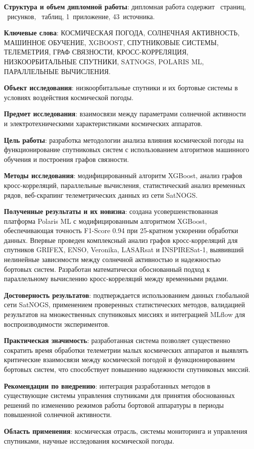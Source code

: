 \textbf{Структура и объем дипломной работы}: дипломная работа содержит \pageref{LastPage}~страниц, \totalfigures~рисунков, \totaltables~таблиц, 1~приложение, 43~источника.

\textbf{Ключевые слова}: КОСМИЧЕСКАЯ ПОГОДА, СОЛНЕЧНАЯ АКТИВНОСТЬ, МАШИННОЕ ОБУЧЕНИЕ, XGBOOST, СПУТНИКОВЫЕ СИСТЕМЫ, ТЕЛЕМЕТРИЯ, ГРАФ СВЯЗНОСТИ, КРОСС-КОРРЕЛЯЦИЯ, НИЗКООРБИТАЛЬНЫЕ СПУТНИКИ, SATNOGS, POLARIS ML, ПАРАЛЛЕЛЬНЫЕ ВЫЧИСЛЕНИЯ.

\textbf{Объект исследования}: низкоорбитальные спутники и их бортовые системы в условиях воздействия космической погоды.

\textbf{Предмет исследования}: взаимосвязи между параметрами солнечной активности и электротехническими характеристиками космических аппаратов.

\textbf{Цель работы}: разработка методологии анализа влияния космической погоды на функционирование спутниковых систем с использованием алгоритмов машинного обучения и построения графов связности.

\textbf{Методы исследования}: модифицированный алгоритм XGBoost, анализ графов кросс-корреляций, параллельные вычисления, статистический анализ временных рядов, веб-скрапинг телеметрических данных из сети SatNOGS.

\textbf{Полученные результаты и их новизна}: создана усовершенствованная платформа Polaris ML с модифицированным алгоритмом XGBoost, обеспечивающая точность F1-Score 0.94 при 25-кратном ускорении обработки данных. Впервые проведен комплексный анализ графов кросс-корреляций для спутников GRIFEX, ENSO, Veronika, LASARsat и INSPIRESat-1, выявивший нелинейные зависимости между солнечной активностью и надежностью бортовых систем. Разработан математически обоснованный подход к параллельному вычислению кросс-корреляций между временными рядами.

\textbf{Достоверность результатов}: подтверждается использованием данных глобальной сети SatNOGS, применением проверенных статистических методов, валидацией результатов на множественных спутниковых миссиях и интеграцией MLflow для воспроизводимости экспериментов.

\textbf{Практическая значимость}: разработанная система позволяет существенно сократить время обработки телеметрии малых космических аппаратов и выявлять критические взаимосвязи между космической погодой и функционированием бортовых систем, что способствует повышению надежности спутниковых миссий.

\textbf{Рекомендации по внедрению}: интеграция разработанных методов в существующие системы управления спутниками для принятия обоснованных решений по изменению режимов работы бортовой аппаратуры в периоды повышенной солнечной активности.

\textbf{Область применения}: космическая отрасль, системы мониторинга и управления спутниками, научные исследования космической погоды.
